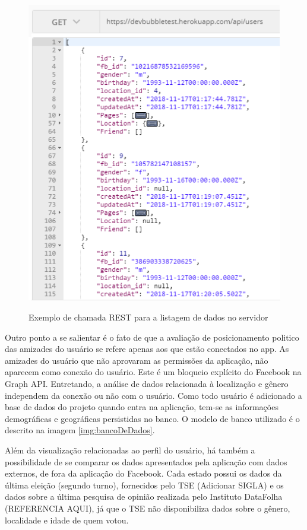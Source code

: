 \documentclass[
	12pt,				%
	oneside,			%
	a4paper,			%
	english,			%
	brazil				%
	]{abntex2ppgsi}
\begin{document}
\begin{figure}[H]
	\centering
	\caption{Exemplo de chamada REST para a listagem de dados no servidor}
	\includegraphics[scale=0.7]{figura2.png}
	\label{fig:figura2}
\end{figure}

Outro ponto a se salientar é o fato de que a avaliação de posicionamento politico das amizades do usuário se refere apenas aos que estão conectados no app. As amizades do usuário que não aprovaram as permissões da aplicação, não aparecem como conexão do usuário. Este é um bloqueio explícito do Facebook na Graph API. Entretando, a análise de dados relacionada à localização e gênero independem da conexão ou não com o usuário. Como todo usuário é adicionado a base de dados do projeto quando entra na aplicação, tem-se as informações demográficas e geográficas persistidas no banco. O modelo de banco utilizado é o descrito na imagem \ref{img:bancoDeDados}.

Além da visualização relacionadas ao perfil do usuário, há também a possibilidade de se comparar os dados apresentados pela aplicação com dados externos, de fora da aplicação do Facebook. Cada estado possui os dados da última eleição (segundo turno), fornecidos pelo TSE (Adicionar SIGLA) e os dados sobre a última pesquisa de opinião realizada pelo Instituto DataFolha (REFERENCIA AQUI), já que o TSE não disponibiliza dados sobre o gênero, localidade e idade de quem votou. 
\end{document}
